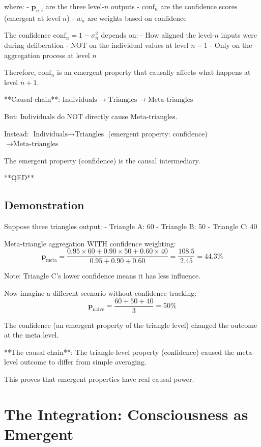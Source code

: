 \documentclass[12pt,a4paper]{article}
\theoremstyle{definition}
\begin{document}
{where:
- $\mathbf{p}_{n,i}$ are the three level-$n$ outputs
- $\text{conf}_n$ are the confidence scores (emergent at level $n$)
- $w_n$ are weights based on confidence

The confidence $\text{conf}_n = 1 - \sigma^2_n$ depends on:
- How aligned the level-$n$ inputs were during deliberation
- NOT on the individual values at level $n-1$
- Only on the aggregation process at level $n$

Therefore, $\text{conf}_n$ is an emergent property that causally affects what happens at level $n+1$.

**Causal chain**: $\text{Individuals} \to \text{Triangles} \to \text{Meta-triangles}$

But: $\text{Individuals}$ do NOT directly cause $\text{Meta-triangles}$.

Instead: $\text{Individuals} \to \text{Triangles}$ (emergent property: confidence) $\to \text{Meta-triangles}$

The emergent property (confidence) is the causal intermediary.

**QED**

\subsection{Demonstration}

Suppose three triangles output:
- Triangle A: 60%
- Triangle B: 50%
- Triangle C: 40%

Meta-triangle aggregation WITH confidence weighting:
$$\mathbf{p}_{\text{meta}} = \frac{0.95 \times 60 + 0.90 \times 50 + 0.60 \times 40}{0.95 + 0.90 + 0.60} = \frac{108.5}{2.45} = 44.3\%$$

Note: Triangle C's lower confidence means it has less influence.

Now imagine a different scenario without confidence tracking:
$$\mathbf{p}_{\text{naive}} = \frac{60 + 50 + 40}{3} = 50\%$$

The confidence (an emergent property of the triangle level) changed the outcome at the meta level.

**The causal chain**: The triangle-level property (confidence) caused the meta-level outcome to differ from simple averaging.

This proves that emergent properties have real causal power.

\section{The Integration: Consciousness as Emergent}

}
\end{document}
